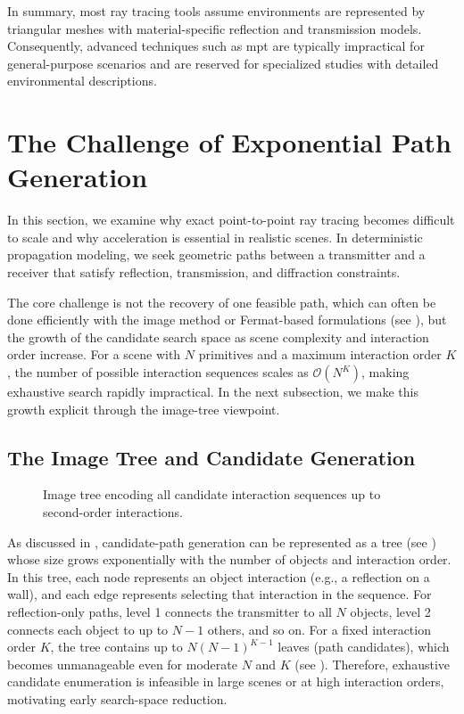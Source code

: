 In summary, most ray tracing tools assume environments are represented by triangular meshes with material-specific reflection and transmission models. Consequently, advanced techniques such as \gls{mpt} are typically impractical for general-purpose scenarios and are reserved for specialized studies with detailed environmental descriptions.

\section{The Challenge of Exponential Path Generation}

In this section, we examine why exact point-to-point ray tracing becomes difficult to scale and why acceleration is essential in realistic scenes. In deterministic propagation modeling, we seek geometric paths between a transmitter and a receiver that satisfy reflection, transmission, and diffraction constraints.

The core challenge is not the recovery of one feasible path, which can often be done efficiently with the image method or Fermat-based formulations (see ), but the growth of the candidate search space as scene complexity and interaction order increase. For a scene with $N$ primitives and a maximum interaction order $K$, the number of possible interaction sequences scales as $\mathcal{O}(N^K)$, making exhaustive search rapidly impractical. In the next subsection, we make this growth explicit through the image-tree viewpoint.

\subsection{The Image Tree and Candidate Generation}

\begin{figure}
  \centering
  \caption{Image tree encoding all candidate interaction sequences up to second-order interactions.}
\end{figure}

As discussed in , candidate-path generation can be represented as a tree (see ) whose size grows exponentially with the number of objects and interaction order. In this tree, each node represents an object interaction (e.g., a reflection on a wall), and each edge represents selecting that interaction in the sequence. For reflection-only paths, level 1 connects the transmitter to all $N$ objects, level 2 connects each object to up to $N-1$ others, and so on. For a fixed interaction order $K$, the tree contains up to $N(N-1)^{K-1}$ leaves (path candidates), which becomes unmanageable even for moderate $N$ and $K$ (see ). Therefore, exhaustive candidate enumeration is infeasible in large scenes or at high interaction orders, motivating early search-space reduction.


